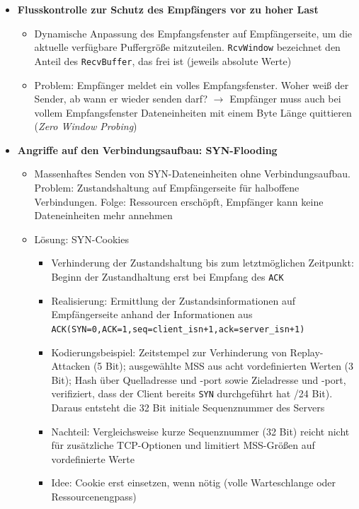 \begin{itemize}
\begin{itemize}
\begin{minipage}{\linewidth}
			\end{minipage}
	\end{itemize}
	\item \textbf{Flusskontrolle zur Schutz des Empfängers vor zu hoher Last}
	\begin{itemize}
		\item Dynamische Anpassung des Empfangsfenster auf Empfängerseite, um die aktuelle verfügbare Puffergröße mitzuteilen. \texttt{RcvWindow} bezeichnet den Anteil des \texttt{RecvBuffer}, das frei ist (jeweils absolute Werte)
		\item Problem: Empfänger meldet ein volles Empfangsfenster. Woher weiß der Sender, ab wann er wieder senden darf? \(\rightarrow\) Empfänger muss auch bei vollem Empfangsfenster Dateneinheiten mit einem Byte Länge quittieren (\textit{Zero Window Probing})
	\end{itemize}
	\item \textbf{Angriffe auf den Verbindungsaufbau: SYN-Flooding}
	\begin{itemize}
		\item Massenhaftes Senden von SYN-Dateneinheiten ohne Verbindungsaufbau. Problem: Zustandshaltung auf Empfängerseite für halboffene Verbindungen. Folge: Ressourcen erschöpft, Empfänger kann keine Dateneinheiten mehr annehmen
		\item Lösung: SYN-Cookies
		\begin{itemize}
			\item Verhinderung der Zustandshaltung bis zum letztmöglichen Zeitpunkt: Beginn der Zustandhaltung erst bei Empfang des \texttt{ACK}
			\item Realisierung: Ermittlung der Zustandsinformationen auf Empfängerseite anhand der Informationen aus \texttt{ACK(SYN=0,ACK=1,seq=client\_isn+1,ack=server\_isn+1)}
			\item Kodierungsbeispiel: Zeitstempel zur Verhinderung von Replay-Attacken (5 Bit); ausgewählte MSS aus acht vordefinierten Werten (3 Bit); Hash über Quelladresse und -port sowie Zieladresse und -port, verifiziert, dass der Client bereits \texttt{SYN} durchgeführt hat /24 Bit). Daraus entsteht die 32 Bit initiale Sequenznummer des Servers
			\item Nachteil: Vergleichsweise kurze Sequenznummer (32 Bit) reicht nicht für zusätzliche TCP-Optionen und limitiert MSS-Größen auf vordefinierte Werte
			\item Idee: Cookie erst einsetzen, wenn nötig (volle Warteschlange oder Ressourcenengpass)
		\end{itemize}
	\end{itemize}
\end{itemize}

